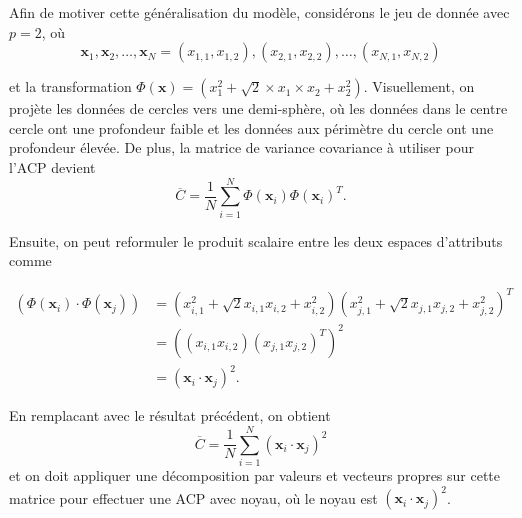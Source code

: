 Afin de motiver cette généralisation du modèle, considérons le jeu de donnée avec $p = 2$, où
$$\textbf{x}_1, \textbf{x}_2, \dots, \textbf{x}_N = (x_{1,1},x_{1,2}), (x_{2,1}, x_{2,2}), …, (x_{N,1}, x_{N,2})$$

et la transformation $\Phi(\textbf{x})= (x_1^2 + \sqrt{2} \times x_1\times x_2 + x_2^2)$. Visuellement, on projète les données de cercles vers une demi-sphère, où les données dans le centre cercle ont une profondeur faible et les données aux périmètre du cercle ont une profondeur élevée. De plus, la matrice de variance covariance à utiliser pour l’ACP devient
$$\overline{C} = \frac{1}{N} \sum_{i = 1}^{N}   \Phi(\textbf{x}_i) \Phi(\textbf{x}_i)^{T}.$$

Ensuite, on peut reformuler le produit scalaire entre les deux espaces d'attributs comme

\begin{align*}
(\Phi(\textbf{x}_i) \cdot \Phi(\textbf{x}_j)) &= (x_{i, 1}^2 + \sqrt{2} x_{i, 1} x_{i, 2} + x_{i, 2}^2)(x_{j, 1}^2 + \sqrt{2} x_{j, 1} x_{j, 2} + x_{j, 2}^2)^T\\
&= ((x_{i, 1}x_{i, 2})(x_{j, 1}x_{j, 2})^T)^2\\
&= (\textbf{x}_i \cdot \textbf{x}_j)^2.
\end{align*}

En remplacant avec le résultat précédent, on obtient
$$\overline{C} = \frac{1}{N} \sum_{i = 1}^{N} (\textbf{x}_i \cdot \textbf{x}_j)^2$$ et on doit appliquer une décomposition par valeurs et vecteurs propres sur cette matrice pour effectuer une ACP avec noyau, où le noyau est $(\textbf{x}_i \cdot \textbf{x}_j)^2$.
